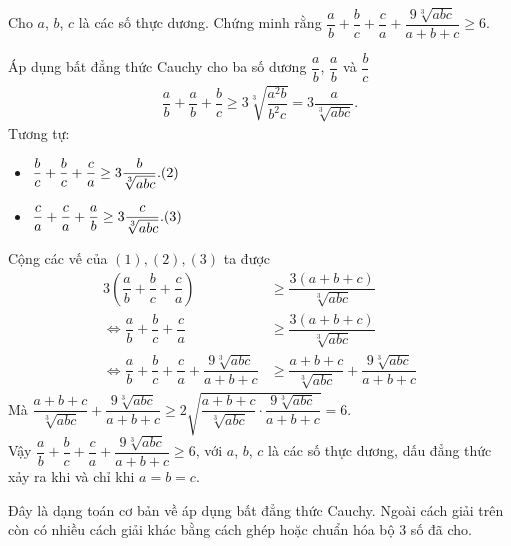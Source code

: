 \begin{bt}%
Cho $a$, $b$, $c$ là các số thực dương. Chứng minh rằng $\dfrac{a}{b}+\dfrac{b}{c}+\dfrac{c}{a}+\dfrac{9\sqrt[3]{abc}}{a+b+c}\ge 6.$
\loigiai
{Áp dụng bất đẳng thức Cauchy cho ba số dương $\dfrac{a}{b}$, $\dfrac{a}{b}$ và $\dfrac{b}{c}$
\begin{align*}
\dfrac{a}{b}+\dfrac{a}{b}+\dfrac{b}{c}\ge 3\sqrt[3]{\dfrac{a^2b}{b^2c}}=3\dfrac{a}{\sqrt[3]{abc}}.\tag{1}
\end{align*}
Tương tự:
\begin{itemize}
\item $\dfrac{b}{c}+\dfrac{b}{c}+\dfrac{c}{a}\ge 3\dfrac{b}{\sqrt[3]{abc}}.\hfill (2)$
\item $\dfrac{c}{a}+\dfrac{c}{a}+\dfrac{a}{b}\ge 3\dfrac{c}{\sqrt[3]{abc}}.\hfill (3)$
\end{itemize}
Cộng các vế của $(1), (2), (3)$ ta được
\begin{align*}
3\left(\dfrac{a}{b}+\dfrac{b}{c}+\dfrac{c}{a}\right)&\ge\dfrac{3(a+b+c)}{\sqrt[3]{abc}}\\
\Leftrightarrow \dfrac{a}{b}+\dfrac{b}{c}+\dfrac{c}{a}&\ge \dfrac{3(a+b+c)}{\sqrt[3]{abc}}\\
\Leftrightarrow \dfrac{a}{b}+\dfrac{b}{c}+\dfrac{c}{a}+\dfrac{9\sqrt[3]{abc}}{a+b+c}&\ge \dfrac{a+b+c}{\sqrt[3]{abc}}+\dfrac{9\sqrt[3]{abc}}{a+b+c}
\end{align*}
Mà $\dfrac{a+b+c}{\sqrt[3]{abc}}+\dfrac{9\sqrt[3]{abc}}{a+b+c}\ge 2\sqrt{\dfrac{a+b+c}{\sqrt[3]{abc}}\cdot\dfrac{9\sqrt[3]{abc}}{a+b+c}}=6$.\\
Vậy $\dfrac{a}{b}+\dfrac{b}{c}+\dfrac{c}{a}+\dfrac{9\sqrt[3]{abc}}{a+b+c}\ge 6$, với $a$, $b$, $c$ là các số thực dương, dấu đẳng thức xảy ra khi và chỉ khi $a=b=c$.
\begin{nx}
Đây là dạng toán cơ bản về áp dụng bất đẳng thức Cauchy. Ngoài cách giải trên còn có nhiều cách giải khác bằng cách ghép hoặc chuẩn hóa bộ 3 số đã cho.
\end{nx}
}
\end{bt}
